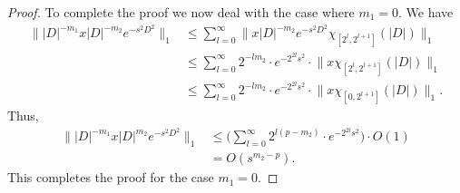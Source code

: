 \begin{proof}
        To complete the proof we now deal with the case where $m_1=0.$ We have
        \begin{align*}
               \||D|^{-m_1}x|D|^{-m_2}e^{-s^2D^2}\|_1 &\leq \sum_{l=0}^{\infty}\Big\|x|D|^{-m_2}e^{-s^2D^2}\chi_{[2^l,2^{l+1}]}(|D|)\Big\|_1\\
                                                      &\leq \sum_{l=0}^{\infty}2^{-lm_2}\cdot e^{-2^{2l}s^2}\cdot\Big\|x\chi_{[2^l,2^{l+1}]}(|D|)\Big\|_1\\
                                                      &\leq \sum_{l=0}^{\infty}2^{-lm_2}\cdot e^{-2^{2l}s^2}\cdot\Big\|x\chi_{[0,2^{l+1}]}(|D|)\Big\|_1.
        \end{align*}
        Thus,
        \begin{align*}
            \||D|^{-m_1}x|D|^{m_2}e^{-s^2D^2}\|_1 &\leq \Big(\sum_{l=0}^{\infty}2^{l(p-m_2)}\cdot e^{-2^{2l}s^2}\Big)\cdot O(1)\\
                                                  &= O(s^{m_2-p}).
        \end{align*}
        This completes the proof for the case $m_1=0.$
    \end{proof}

